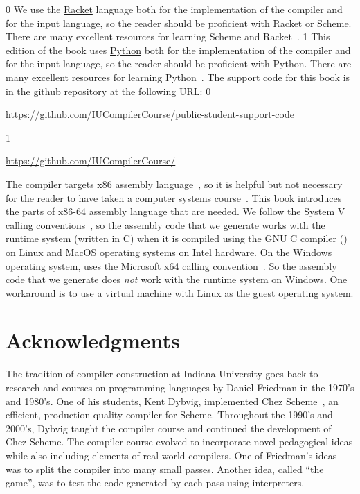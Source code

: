 \documentclass[7x10]{TimesAPriori_MIT}%
\def\racketEd{0}
\def\pythonEd{1}
\def\edition{1}
\newcommand{\racket}[1]{{\if\edition\racketEd{#1}\fi}}
\newcommand{\python}[1]{{\if\edition\pythonEd #1\fi}}
\begin{document}
\racket{
We use the \href{https://racket-lang.org/}{Racket} language both for
the implementation of the compiler and for the input language, so the
reader should be proficient with Racket or Scheme. There are many
excellent resources for learning Scheme and
Racket~\citep{Dybvig:1987aa,Abelson:1996uq,Friedman:1996aa,Felleisen:2001aa,Felleisen:2013aa,Flatt:2014aa}.
}
\python{
  This edition of the book uses \href{https://www.python.org/}{Python}
  both for the implementation of the compiler and for the input language, so the
reader should be proficient with Python. There are many
excellent resources for learning Python~\citep{Lutz:2013vp,Barry:2016vj,Sweigart:2019vn,Matthes:2019vs}.
}
The support code for this book is in the github repository at
the following URL:
\if\edition\racketEd
\begin{center}\small
  \url{https://github.com/IUCompilerCourse/public-student-support-code}
\end{center}
\fi
\if\edition\pythonEd
\begin{center}\small
  \url{https://github.com/IUCompilerCourse/}
\end{center}
\fi

The compiler targets x86 assembly language~\citep{Intel:2015aa}, so it
is helpful but not necessary for the reader to have taken a computer
systems course~\citep{Bryant:2010aa}. This book introduces the parts
of x86-64 assembly language that are needed.
%
We follow the System V calling
conventions~\citep{Bryant:2005aa,Matz:2013aa}, so the assembly code
that we generate works with the runtime system (written in C) when it
is compiled using the GNU C compiler () on Linux and MacOS
operating systems on Intel hardware.
%
On the Windows operating system,  uses the Microsoft x64
calling convention~\citep{Microsoft:2018aa,Microsoft:2020aa}. So the
assembly code that we generate does \emph{not} work with the runtime
system on Windows. One workaround is to use a virtual machine with
Linux as the guest operating system.

\section*{Acknowledgments}

The tradition of compiler construction at Indiana University goes back
to research and courses on programming languages by Daniel Friedman in
the 1970's and 1980's.  One of his students, Kent Dybvig, implemented
Chez Scheme~\citep{Dybvig:2006aa}, an efficient, production-quality
compiler for Scheme.  Throughout the 1990's and 2000's, Dybvig taught
the compiler course and continued the development of Chez Scheme.
%
The compiler course evolved to incorporate novel pedagogical ideas
while also including elements of real-world compilers.  One of
Friedman's ideas was to split the compiler into many small
passes. Another idea, called ``the game'', was to test the code
generated by each pass using interpreters.
\end{document}
